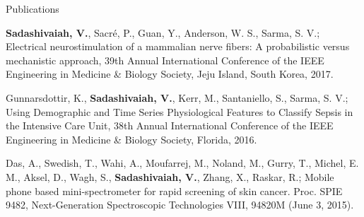\documentclass{resume}
\begin{document}
\begin{rSection}{Publications}
\begin{publications}
\item \textbf{Sadashivaiah, V.}, Sacré, P., Guan, Y., Anderson, W. S., Sarma, S. V.; Electrical neurostimulation of a mammalian nerve fibers: A probabilistic versus mechanistic approach, 39th Annual International Conference of the IEEE Engineering in Medicine \& Biology Society, Jeju Island, South Korea, 2017.

\item Gunnarsdottir, K., \textbf{Sadashivaiah, V.}, Kerr, M., Santaniello, S., Sarma, S. V.; Using Demographic and Time Series Physiological Features to Classify Sepsis in the Intensive Care Unit, 38th Annual International Conference of the IEEE Engineering in Medicine \& Biology Society, Florida, 2016.

\item Das, A., Swedish, T., Wahi, A., Moufarrej, M., Noland, M., Gurry, T., Michel, E. M., Aksel, D., Wagh, S., \textbf{Sadashivaiah, V.}, Zhang, X., Raskar, R.; Mobile phone based mini-spectrometer for rapid screening of skin cancer. Proc. SPIE 9482, Next-Generation Spectroscopic Technologies VIII, 94820M (June 3, 2015).

\end{publications}
\end{rSection} 
\end{document}
